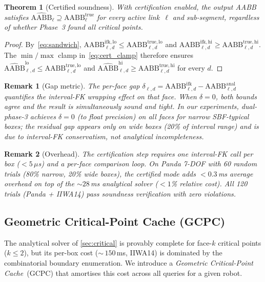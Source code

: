 \documentclass[journal]{IEEEtran}
\newtheorem{theorem}{Theorem}
\newtheorem{remark}{Remark}
\newcommand{\AABB}{\text{AABB}}
\begin{document}
\begin{theorem}[Certified soundness]\label{thm:cert_sound}
With certification enabled, the output AABB satisfies
$\widehat{\AABB}_\ell \supseteq \AABB^{\mathrm{true}}_\ell$
for every active link~$\ell$ and sub-segment, regardless of
whether Phase~3 found all critical points.
\end{theorem}
\begin{proof}
By~\eqref{eq:sandwich},
$\AABB_{\ell,d}^{\mathrm{ifk,lo}} \leq
 \AABB_{\ell,d}^{\mathrm{true,lo}}$
and
$\AABB_{\ell,d}^{\mathrm{ifk,hi}} \geq
 \AABB_{\ell,d}^{\mathrm{true,hi}}$.
The $\min/\max$ clamp in~\eqref{eq:cert_clamp} therefore
ensures $\widehat{\AABB}_{\ell,d}^{\mathrm{lo}} \leq
\AABB_{\ell,d}^{\mathrm{true,lo}}$
and $\widehat{\AABB}_{\ell,d}^{\mathrm{hi}} \geq
\AABB_{\ell,d}^{\mathrm{true,hi}}$
for every $d$.
\end{proof}

\begin{remark}[Gap metric]
The per-face gap
$\delta_{\ell,d}
  = \AABB^{\mathrm{ifk}}_{\ell,d} - \AABB^{\mathrm{anal}}_{\ell,d}$
quantifies the interval-FK wrapping effect on that face.
When $\delta = 0$, both bounds agree and the result is
\emph{simultaneously sound and tight}.
In our experiments, dual-phase-3 achieves $\delta = 0$
(to float precision) on all faces for narrow SBF-typical boxes;
the residual gap appears only on wide boxes (20\% of interval range)
and is due to interval-FK conservatism, not analytical incompleteness.
\end{remark}

\begin{remark}[Overhead]
The certification step requires one interval-FK call per box ($< 5\,\mu$s)
and a per-face comparison loop.
On Panda 7-DOF with 60 random trials (80\% narrow, 20\% wide boxes),
the certified mode adds $< 0.3$\,ms average overhead on top of the
${\sim}28$\,ms analytical solver ($< 1$\% relative cost).
All 120 trials (Panda + IIWA14) pass soundness verification with zero
violations.
\end{remark}

\subsection{Geometric Critical-Point Cache (GCPC)}\label{sec:gcpc}

The analytical solver of \cref{sec:critical} is provably complete
for face-$k$ critical points ($k \leq 2$), but its per-box cost
($\sim$\,$150$\,ms, IIWA14) is dominated by the combinatorial
boundary enumeration.
We introduce a \emph{Geometric Critical-Point Cache}~(GCPC) that
amortises this cost across all queries for a given robot.
\end{document}

